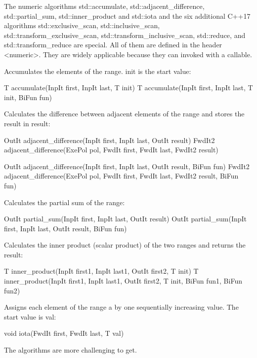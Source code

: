 The numeric algorithms std::accumulate, std::adjacent\_difference, std::partial\_sum, std::inner\_product and std::iota and the six additional C++17 algorithms std::exclusive\_scan, std::inclusive\_scan, std::transform\_exclusive\_scan, std::transform\_inclusive\_scan, std::reduce, and std::transform\_reduce are special. All of them are defined in the header <numeric>. They are widely applicable because they can invoked with a callable.

Accumulates the elements of the range. init is the start value:

\begin{cpp}
T accumulate(InpIt first, InpIt last, T init)
T accumulate(InpIt first, InpIt last, T init, BiFun fun)
\end{cpp}

Calculates the difference between adjacent elements of the range and stores the result in result:

\begin{cpp}
OutIt adjacent_difference(InpIt first, InpIt last, OutIt result)
FwdIt2 adjacent_difference(ExePol pol, FwdIt first, FwdIt last, FwdIt2 result)

OutIt adjacent_difference(InpIt first, InpIt last, OutIt result, BiFun fun)
FwdIt2 adjacent_difference(ExePol pol, FwdIt first, FwdIt last,
						   FwdIt2 result, BiFun fun)
\end{cpp}

Calculates the partial sum of the range:

\begin{cpp}
OutIt partial_sum(InpIt first, InpIt last, OutIt result)
OutIt partial_sum(InpIt first, InpIt last, OutIt result, BiFun fun)
\end{cpp}

Calculates the inner product (scalar product) of the two ranges and returns the result:

\begin{cpp}
T inner_product(InpIt first1, InpIt last1, OutIt first2, T init)
T inner_product(InpIt first1, InpIt last1, OutIt first2, T init,
				BiFun fun1, BiFun fun2)
\end{cpp}

Assigns each element of the range a by one sequentially increasing value. The start value is val:

\begin{cpp}
void iota(FwdIt first, FwdIt last, T val)
\end{cpp}

The algorithms are more challenging to get.

